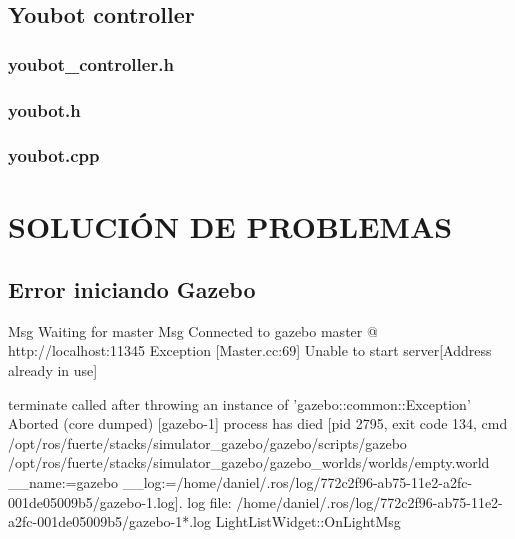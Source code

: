 \documentclass[12pt, a4paper]{report}
\begin{document}
\section{Youbot controller}

\subsection{youbot\_controller.h}
\lstset{inputencoding=utf8/latin1}

\newpage

\subsection{youbot.h}
\lstset{inputencoding=utf8/latin1}

\newpage

\subsection{youbot.cpp}
\lstset{inputencoding=utf8/latin1}

\newpage

\fi

\chapter{SOLUCIÓN DE PROBLEMAS}



\section{Error iniciando Gazebo}

\begin{spverbatim}
Msg Waiting for master
Msg Connected to gazebo master @ http://localhost:11345
Exception [Master.cc:69] Unable to start server[Address already in use]


terminate called after throwing an instance of 'gazebo::common::Exception'
Aborted (core dumped)
[gazebo-1] process has died [pid 2795, exit code 134, cmd /opt/ros/fuerte/stacks/simulator_gazebo/gazebo/scripts/gazebo /opt/ros/fuerte/stacks/simulator_gazebo/gazebo_worlds/worlds/empty.world __name:=gazebo __log:=/home/daniel/.ros/log/772c2f96-ab75-11e2-a2fc-001de05009b5/gazebo-1.log].
log file: /home/daniel/.ros/log/772c2f96-ab75-11e2-a2fc-001de05009b5/gazebo-1*.log
LightListWidget::OnLightMsg
\end{spverbatim}
\end{document}
